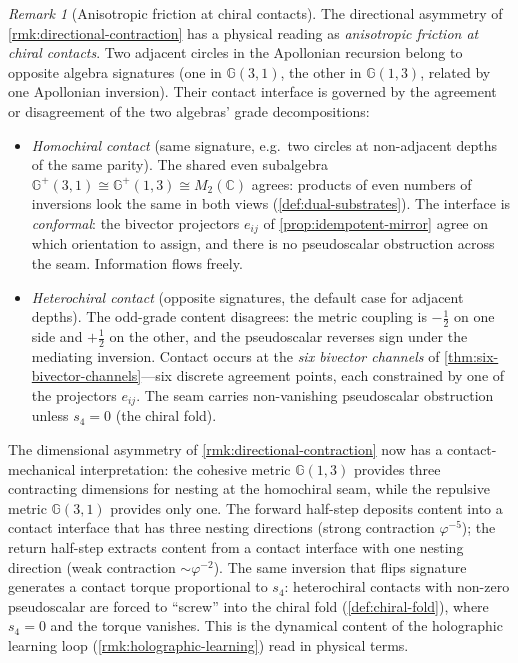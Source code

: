 \documentclass[11pt,a4paper]{article}
\theoremstyle{plain}
\theoremstyle{definition}
\theoremstyle{remark}
\newtheorem{remark}[theorem]{Remark}
\numberwithin{equation}{section}
\newcommand{\Cl}{\mathbb{G}}
\newcommand{\vp}{\varphi}
\begin{document}
\begin{remark}[Anisotropic friction at chiral contacts]
\label{rmk:chiral-contact-friction}
The directional asymmetry of \cref{rmk:directional-contraction} has a
physical reading as \emph{anisotropic friction at chiral contacts}.
Two adjacent circles in the Apollonian recursion belong to opposite
algebra signatures (one in \(\Cl(3,1)\), the other in \(\Cl(1,3)\),
related by one Apollonian inversion).  Their contact interface is
governed by the agreement or disagreement of the two algebras' grade
decompositions:

\begin{itemize}
\item[(a)] \emph{Homochiral contact} (same signature, e.g.~two
  circles at non-adjacent depths of the same parity).  The shared
  even subalgebra \(\Cl^+(3,1)\cong\Cl^+(1,3)\cong M_2(\mathbb{C})\)
  agrees: products of even numbers of inversions look the same in
  both views (\cref{def:dual-substrates}).  The interface is
  \emph{conformal}: the bivector projectors \(e_{ij}\) of
  \cref{prop:idempotent-mirror} agree on which orientation to
  assign, and there is no pseudoscalar obstruction across the seam.
  Information flows freely.
\item[(b)] \emph{Heterochiral contact} (opposite signatures, the
  default case for adjacent depths).  The odd-grade content
  disagrees: the metric coupling is \(-\tfrac12\) on one side and
  \(+\tfrac12\) on the other, and the pseudoscalar reverses sign
  under the mediating inversion.  Contact occurs at the \emph{six
  bivector channels} of \cref{thm:six-bivector-channels}---six
  discrete agreement points, each constrained by one of the
  projectors \(e_{ij}\).  The seam carries non-vanishing pseudoscalar
  obstruction unless \(s_4=0\) (the chiral fold).
\end{itemize}

The dimensional asymmetry of \cref{rmk:directional-contraction} now
has a contact-mechanical interpretation: the cohesive metric
\(\Cl(1,3)\) provides three contracting dimensions for nesting at
the homochiral seam, while the repulsive metric \(\Cl(3,1)\) provides
only one.  The forward half-step deposits content into a contact
interface that has three nesting directions (strong contraction
\(\vp^{-5}\)); the return half-step extracts content from a contact
interface with one nesting direction (weak contraction
\(\sim\vp^{-2}\)).  The same inversion that flips signature
generates a contact torque proportional to \(s_4\): heterochiral
contacts with non-zero pseudoscalar are forced to ``screw'' into the
chiral fold (\cref{def:chiral-fold}), where \(s_4=0\) and the torque
vanishes.  This is the dynamical content of the holographic learning
loop (\cref{rmk:holographic-learning}) read in physical terms.


\end{remark}
\end{document}
